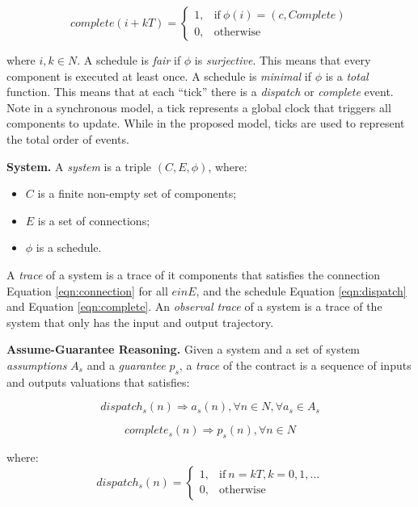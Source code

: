 \begin{equation}
\label{eqn:complete}
    complete(i+kT) =
    \begin{cases}
      1, & \text{if}\ \phi(i) = (c, Complete) \\
      0, & \text{otherwise}
    \end{cases}
\end{equation}

where $i,k\in N$.
A schedule is \emph{fair} if $\phi$ is \emph{surjective}. This means that every component is executed at least once.
A schedule is \emph{minimal} if $\phi$ is a \emph{total} function. This means that at each ``tick'' there is a \emph{dispatch} or \emph{complete} event. Note in a synchronous model, a tick represents a global clock that triggers all components to update. While in the proposed model, ticks are used to represent the total order of events. 

{\bf System.}
A \emph{system} is a triple $(C, E, \phi)$, where:
\begin{itemize}
    	\item $C$ is a finite non-empty set of components;
    	\item $E$ is a set of connections;
    	\item $\phi$ is a schedule.
\end{itemize}
A \emph{trace} of a system is a trace of it components that satisfies the connection Equation \ref{eqn:connection} for all $e in E$, and the schedule Equation \ref{eqn:dispatch} and Equation \ref{eqn:complete}.
An \emph{observal trace} of a system is a trace of the system that only has the input and output trajectory.

{\bf Assume-Guarantee Reasoning.}
Given a system and a set of system \emph{assumptions} $A_s$ and a \emph{guarantee} $p_s$, a \emph{trace} of the contract is a sequence of inputs and outputs valuations that satisfies:

\begin{equation} 
\label{eqn:sys_assumption}
dispatch_s(n) \Rightarrow a_s(n), \forall n\in N, \forall a_s \in A_s
\end{equation}

\begin{equation} 
\label{eqn:sys_assumption}
complete_s(n) \Rightarrow p_s(n), \forall n\in N
\end{equation}

where:
\begin{equation}
\label{eqn:sys_dispatch}
    dispatch_s(n) =
    \begin{cases}
      1, & \text{if}\ n = kT, k=0,1,... \\
      0, & \text{otherwise}
    \end{cases}
\end{equation}

